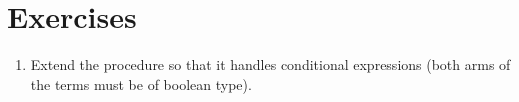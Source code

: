 \section*{Exercises}

\begin{enumerate}
\item Extend the procedure so that it handles conditional expressions
  (both arms of the terms must be of boolean type).
\end{enumerate}


